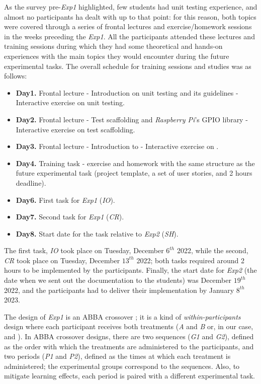 As the survey pre-\textit{Exp1} highlighted, few students had unit testing experience, and almost no participants ha dealt with \tdd up to that point: for this reason, both topics were covered through a series of frontal lectures and exercise/homework sessions in the weeks preceding the \textit{Exp1}. All the participants attended these lectures and training sessions during which they had some theoretical and hands-on experiences with the main topics they would encounter during the future experimental tasks. The overall schedule for training sessions and studies was as follows:
\begin{itemize}
    \item \textbf{Day1.} Frontal lecture - Introduction on unit testing and its guidelines - Interactive exercise on unit testing.
    \item \textbf{Day2.} Frontal lecture - Test scaffolding and \textit{Raspberry Pi}'s GPIO library - Interactive exercise on test scaffolding.
    \item \textbf{Day3.} Frontal lecture - Introduction to \tdd - Interactive exercise on \tdd.
    \item \textbf{Day4.} Training task - \tdd exercise and homework with the same structure as the future experimental task (\ie project template, a set of user stories, and 2 hours deadline).
    \item \textbf{Day6.} First task for \textit{Exp1} (\textit{IO}).
    \item \textbf{Day7.} Second task for \textit{Exp1} (\textit{CR}).
    \item \textbf{Day8.} Start date for the task relative to \textit{Exp2} (\textit{SH}).
\end{itemize}


The first task, \textit{IO} took place on Tuesday, December $6^{th}$ 2022, while the second, \textit{CR} took place on Tuesday, December $13^{th}$ 2022; both tasks required around 2 hours to be implemented by the participants. Finally, the start date for \textit{Exp2} (\ie the date when we sent out the documentation to the students) was December $19^{th}$ 2022, and the participants had to deliver their implementation by January $8^{th}$ 2023.

The design of \textit{Exp1} is an ABBA crossover \cite{DBLP:journals/tse/VegasAJ16}; it is a kind of \textit{within-participants} design where each participant receives both treatments (\ie \textit{A} and \textit{B} or, in our case, \tdd and \notdd). In ABBA crossover designs, there are two sequences (\ie \textit{G1} and \textit{G2}), defined as the order with which the treatments are administered to the participants, and two periods (\ie \textit{P1} and \textit{P2}), defined as the times at which each treatment is administered; the experimental groups correspond to the sequences. Also, to mitigate learning effects, each period is paired with a
different experimental task.

